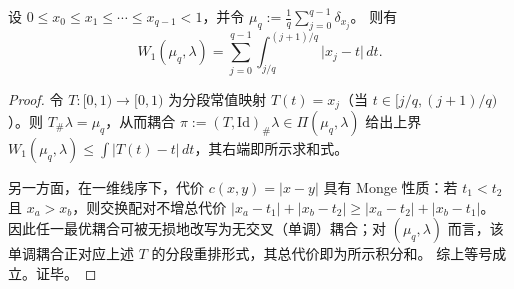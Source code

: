 \begin{lemma}[一维单调耦合的分位公式]\label{lem:w1-quantile-formula-empirical-uniform}
设 \(0\le x_0\le x_1\le\cdots\le x_{q-1}<1\)，并令
\(
\mu_q:=\frac1q\sum_{j=0}^{q-1}\delta_{x_j}
\)。
则有
\[
W_1(\mu_q,\lambda)=\sum_{j=0}^{q-1}\int_{j/q}^{(j+1)/q}\bigl|x_j-t\bigr|\,dt.
\]
\end{lemma}
\begin{proof}
令 \(T:[0,1)\to[0,1)\) 为分段常值映射 \(T(t)=x_j\)（当 \(t\in[j/q,(j+1)/q)\)）。则 \(T_\#\lambda=\mu_q\)，从而耦合 \(\pi:=(T,\mathrm{Id})_\#\lambda\in\Pi(\mu_q,\lambda)\) 给出上界
\(
W_1(\mu_q,\lambda)\le \int|T(t)-t|\,dt
\)，其右端即所示求和式。
\par
另一方面，在一维线序下，代价 \(c(x,y)=|x-y|\) 具有 Monge 性质：若 \(t_1<t_2\) 且 \(x_a>x_b\)，则交换配对不增总代价
\(
|x_a-t_1|+|x_b-t_2|\ge |x_a-t_2|+|x_b-t_1|
\)。
因此任一最优耦合可被无损地改写为无交叉（单调）耦合；对 \((\mu_q,\lambda)\) 而言，该单调耦合正对应上述 \(T\) 的分段重排形式，其总代价即为所示积分和。
综上等号成立。证毕。
\end{proof}

